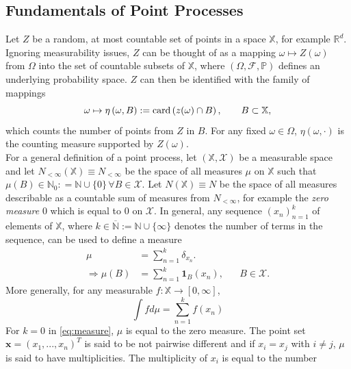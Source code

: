 \subsection{Fundamentals of Point Processes}
Let $Z$ be a random, at most countable set of points in a space $\mathbb{X}$, for example $\mathbb{R}^d$. Ignoring measurability issues, $Z$ can be thought of as a mapping $\omega\mapsto Z\left(\omega\right)$ from $\Omega$ into the set of countable subsets of $\mathbb{X}$, where $\left(\Omega, \mathcal{F}, \mathbb{P}\right)$ defines an underlying probability space. $Z$ can then be identified with the family of mappings
\begin{equation}
    \omega\mapsto\eta\left(\omega, B\right):=\hbox{card}\left(z(\omega)\cap B\right), \hspace{20pt}B\subset\mathbb{X},
\end{equation}
which counts the number of points from $Z$ in $B$. For any fixed $\omega\in\Omega$, $\eta\left(\omega,\cdot\right)$ is the counting measure supported by $Z\left(\omega\right)$. \\
For a general definition of a point process, let $\left(\mathbb{X}, \mathcal{X}\right)$ be a measurable space and let $N_{<\infty}\left(\mathbb{X}\right)\equiv N_{<\infty}$ be the space of all measures $\mu$ on $\mathbb{X}$ such that $\mu(B)\in\mathbb{N}_0: =\mathbb{N}\cup\lbrace0\rbrace\,\forall B\in\mathcal{X}$. Let $N\left(\mathbb{X}\right)\equiv N$ be the space of all measures describable as a countable sum of measures from $N_{<\infty}$, for example the \textit{zero measure} 0 which is equal to $0$ on $\mathcal{X}$. In general, any sequence $\left(x_n\right)_{n=1}^k$ of elements of $\mathbb{X}$, where $k\in\overline{\mathbb{N}}:=\mathbb{N}\cup\lbrace\infty\rbrace$ denotes the number of terms in the sequence, can be used to define a measure
\begin{align}
    \mu&=\sum_{n=1}^k\delta_{x_n}. \label{eq:measure} \\
    \Rightarrow\mu\left(B\right)&=\sum_{n=1}^k\pmb{1}_B\left(x_n\right),\hspace{20pt} B\in\mathcal{X}. \nonumber
\end{align}
More generally, for any measurable $f:\mathbb{X}\rightarrow\left[0,\infty\right]$,
\begin{equation}
    \int fd\mu=\sum_{n=1}^kf\left(x_n\right)
\end{equation}
For $k=0$ in \eqref{eq:measure}, $\mu$ is equal to the zero measure. The point set $\pmb{x}=\left(x_1,...,x_n\right)^T$ is said to be not pairwise different and if $x_i=x_j$ with $i\neq j$, $\mu$ is said to have multiplicities. The multiplicity of $x_i$ is equal to the number
